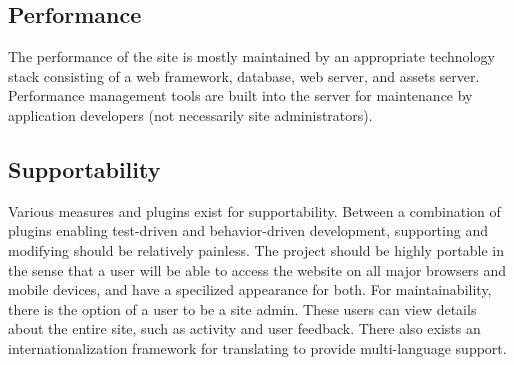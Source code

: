 \subsection{Performance}
The performance of the site is mostly maintained by an appropriate technology stack consisting of a web framework, database, web server, and assets server. Performance management tools are built into the server for maintenance by application developers (not necessarily site administrators).


\subsection{Supportability}
Various measures and plugins exist for supportability. Between a combination of plugins enabling test-driven and behavior-driven development, supporting and modifying should be relatively painless.
The project should be highly portable in the sense that a user will be able to access the website on all major browsers and mobile devices, and have a specilized appearance for both. 
For maintainability, there is the option of a user to be a site admin. These users can view details about the entire site, such as activity and user feedback. 
There also exists an internationalization framework for translating to provide multi-language support.
